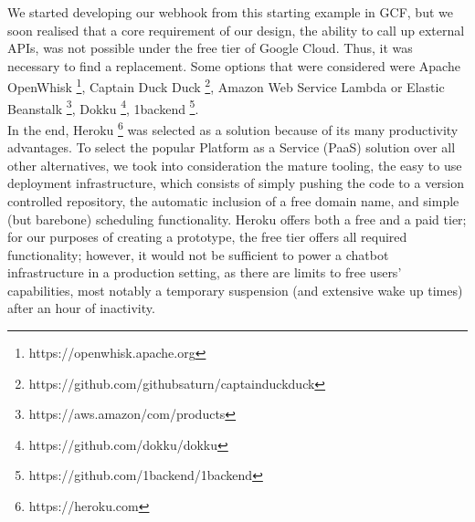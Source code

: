 We started developing our webhook from this starting example in GCF, but we soon realised that a core requirement of our design, the ability to call up external APIs, was not possible under the free tier of Google Cloud. Thus, it was necessary to find a replacement. Some options that were considered were Apache OpenWhisk \footnote{https://openwhisk.apache.org}, Captain Duck Duck \footnote{https://github.com/githubsaturn/captainduckduck}, Amazon Web Service Lambda or Elastic Beanstalk \footnote{https://aws.amazon/com/products}, Dokku \footnote{https://github.com/dokku/dokku}, 1backend \footnote{https://github.com/1backend/1backend}. \\
In the end, Heroku \footnote{https://heroku.com} was selected as a solution because of its many productivity advantages. To select the popular Platform as a Service (PaaS) solution over all other alternatives, we took into consideration the mature tooling, the easy to use deployment infrastructure, which consists of simply pushing the code to a version controlled repository, the automatic inclusion of a free domain name, and simple (but barebone) scheduling functionality. Heroku offers both a free and a paid tier; for our purposes of creating a prototype, the free tier offers all required functionality; however, it would not be sufficient to power a chatbot infrastructure in a production setting, as there are limits to free users' capabilities, most notably a temporary suspension (and extensive wake up times) after an hour of inactivity.

